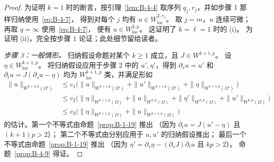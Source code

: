 \begin{proof}
为证明 $k=1$ 时的断言，按引理~\ref{lem:B-4-4} 取序列
$q_j,r_j$，并如步骤 1 那样归纳使用~\eqref{eq:B-4-7}，
得到对每个 $j$ 均有 $u\in W^{2,r_j}_{\mathrm{loc}}$。
取 $j=m$，$u$ 连续可微；再取 $q=\infty$ 使用~\eqref{eq:B-4-7}，
便有 $u\in W^{2,p}_{\mathrm{loc}}$。
这证明了 $k=\ell=1$ 时的 (i)。
为证明 (ii)，完全按步骤 1 论证；此处细节留给读者。

\emph{步骤 3：一般情形。}
归纳假设命题对某个 $k\ge1$ 成立，且 $J\in W^{k+1,p}$。
设 $\eta\in W^{k+1,p}_{\mathrm{loc}}$。
将归纳假设应用于步骤 2 中的 $u',\eta'$，得到
$\partial_su=u'$ 和 $\partial_tu=J(\partial_su-\eta)$
均为 $W^{k+1,p}_{\mathrm{loc}}$ 类，并满足形如
\begin{align*}
  \|u\|_{W^{k+2,p}(\Omega')}
  &\le c_1\bigl(\|u\|_{W^{k+1,p}(\Omega')}
       +\|u'\|_{W^{k+1,p}(\Omega')}
       +\|\eta\|_{W^{k+1,p}(\Omega')}\bigr)\\
  &\le c_2\bigl(\|\eta\|_{W^{k+1,p}(\Omega)}
       +\|u\|_{W^{k,p}(\Omega)}
       +\|\eta'\|_{W^{k,p}(\Omega)}
       +\|u'\|_{W^{k,p}(\Omega)}\bigr)\\
  &\le c_3\bigl(\|\eta\|_{W^{k+1,p}(\Omega)}
       +\|u\|_{W^{k+1,p}(\Omega)}\bigr)
\end{align*}
的估计。第一个不等式由命题~\ref{prop:B-1-19} 推出
（因为 $\partial_tu=J(u'-\eta)$ 且 $(k+1)p>2$）；
第二个不等式由分别应用于 $u,u'$ 的归纳假设推出；
最后一个不等式由命题~\ref{prop:B-1-19} 推出
（因为 $\eta'=\partial_s\eta-(\partial_sJ)\partial_tu$ 且 $kp>2$）。
命题~\ref{prop:B-4-9} 得证。
\end{proof}

